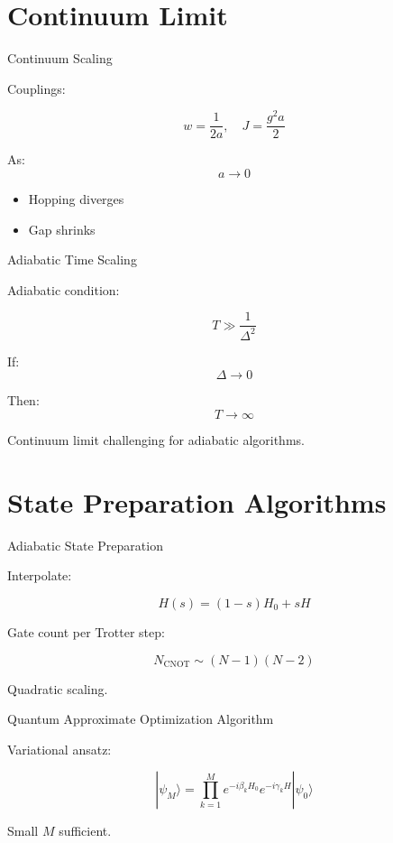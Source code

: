 \documentclass[11pt]{beamer}
\begin{document}
\section{Continuum Limit}

\begin{frame}{Continuum Scaling}

Couplings:

\[
w = \frac{1}{2a}, \quad
J = \frac{g^2 a}{2}
\]

As:
\[
a \to 0
\]

\begin{itemize}
\item Hopping diverges
\item Gap shrinks
\end{itemize}
\end{frame}

\begin{frame}{Adiabatic Time Scaling}

Adiabatic condition:

\[
T \gg \frac{1}{\Delta^2}
\]

If:
\[
\Delta \to 0
\]

Then:
\[
T \to \infty
\]

Continuum limit challenging for adiabatic algorithms.
\end{frame}

\section{State Preparation Algorithms}

\begin{frame}{Adiabatic State Preparation}

Interpolate:

\[
H(s) = (1-s)H_0 + sH
\]

Gate count per Trotter step:

\[
N_{\text{CNOT}} \sim (N-1)(N-2)
\]

Quadratic scaling.
\end{frame}

\begin{frame}{Quantum Approximate Optimization Algorithm}

Variational ansatz:

\[
|\psi_M\rangle
=
\prod_{k=1}^M
e^{-i\beta_k H_0}
e^{-i\gamma_k H}
|\psi_0\rangle
\]

Small $M$ sufficient.
\end{frame}
\end{document}
